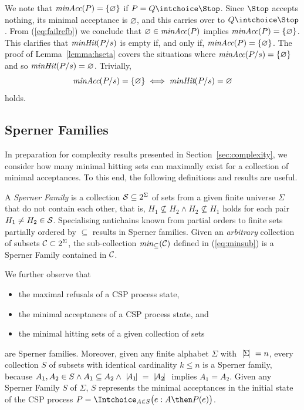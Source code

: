%
We note that $\text{\it minAcc}(P) = \{ \varnothing \}$ if $P = Q\intchoice \Stop$.
Since $\Stop$ accepts nothing, its minimal acceptance is $\varnothing$, and
this carries over to $Q\intchoice \Stop$.  From (\ref{eq:failrefb}) we
conclude that $\varnothing\in\text{\it minAcc}(P)$ implies $\text{\it minAcc}(P) = \{
\varnothing \}$. This clarifies that $\text{\it minHit}(P/s)$ is empty if, and only
if, $\text{\it minAcc}(P) = \{ \varnothing \}$. The proof of Lemma~\ref{lemma:hseta}
covers the situations where $\text{\it minAcc}(P/s) = \{ \varnothing \}$ and so
$\text{\it minHit}(P/s) = \varnothing$. Trivially,
\begin{equation}
\label{eq:minhitminaccempty}
\text{\it minAcc}(P/s) = \{ \varnothing \} \iff \text{\it minHit}(P/s) = \varnothing
\end{equation}
holds.

\subsection{Sperner Families}
\label{sec:sperner}

In preparation for complexity results presented in
Section~\ref{sec:complexity}, we consider how many minimal hitting sets can
maximally exist for a collection of minimal acceptances. To this end, the
following definitions and results are useful.

A \emph{Sperner Family} is a collection ${\cal S} \subseteq 2^\Sigma$ of sets
from a given finite universe $\Sigma$ that do not contain each other, that
is, $H_1 \not\subseteq H_2 \wedge H_2 \not\subseteq H_1$ holds for each pair
$H_1\neq H_2\in {\cal S}$. Specialising antichains known from partial orders
to finite sets partially ordered by $\subseteq$ results in Sperner families.
Given an {\it arbitrary} collection of subsets ${\cal C}\subset 2^\Sigma$,
the sub-collection ${\it min}_\subseteq({\cal C})$ defined in (\ref{eq:minsub}) is a
Sperner Family contained in ${\cal C}$.

\newpage
\noindent
We further observe that
\begin{itemize}
\item the maximal refusals of a CSP process state,
\item the minimal acceptances of a CSP process state, and
\item the minimal hitting sets of a given collection of sets
\end{itemize}
are Sperner families. Moreover, given any finite alphabet $\Sigma$ with
${~|\! \Sigma\!|~} = n$, every collection $S$ of subsets with identical
cardinality $k \le n$ is a Sperner family,  because $A_1, A_2\in S \wedge A_1
\subseteq A_2\wedge {~|\! A_1\!|~} = {~|\! A_2\!|~}$ implies $A_1 = A_2$. Given  any
Sperner Family $S$ of $\Sigma$, $S$ represents the minimal acceptances in the
initial state of the CSP process
$P = \Intchoice_{A\in S}\big( e:A \then P(e) \big)$.

